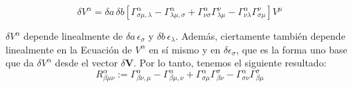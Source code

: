 \documentclass{article}
\begin{document}
\[
\delta V^\alpha = \delta a \, \delta b \left[ \Gamma^\alpha_{\sigma \mu, \lambda} - \Gamma^\alpha_{\lambda \mu, \sigma} + \Gamma^\alpha_{\nu \sigma} \Gamma^\nu_{\lambda \mu} - \Gamma^\alpha_{\nu \lambda} \Gamma^\nu_{\sigma \mu} \right] V^\mu
\]

$\delta V^\alpha$ depende linealmente de $\delta a \, \epsilon_\sigma$ y $\delta b \, \epsilon_\lambda$. 
Además, ciertamente también depende linealmente en la Ecuación de $V^\alpha$ en sí mismo y en $\delta \epsilon_\sigma$, que es la forma uno base que da $\delta V^\alpha$ desde el vector $\delta \mathbf{V}$. 
Por lo tanto, tenemos el siguiente resultado:
\[
R^\alpha_{\beta \mu \nu} := \Gamma^\alpha_{\beta \nu, \mu} - \Gamma^\alpha_{\beta \mu, \nu} + \Gamma^\alpha_{\sigma \mu} \Gamma^\sigma_{\beta \nu} - \Gamma^\alpha_{\sigma \nu} \Gamma^\sigma_{\beta \mu}
\]

\hfill 

\hfill 

\hfill 
\end{document}
